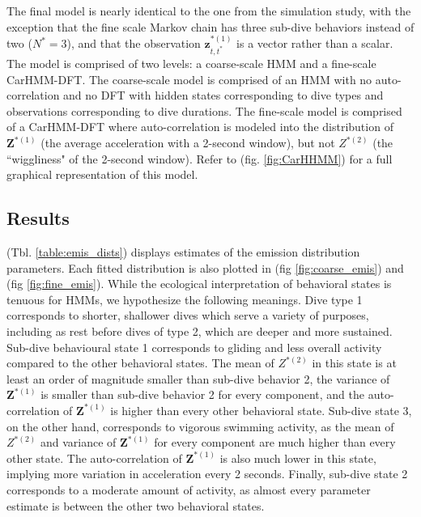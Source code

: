 The final model is nearly identical to the one from the simulation study, with the exception that the fine scale Markov chain has three sub-dive behaviors instead of two ($N^* = 3$), and that the observation $\mathbf{z}^{*(1)}_{t,t^*}$ is a vector rather than a scalar. The model is comprised of two levels: a coarse-scale HMM and a fine-scale CarHMM-DFT. The coarse-scale model is comprised of an HMM with no auto-correlation and no DFT with hidden states corresponding to dive types and observations corresponding to dive durations. The fine-scale model is comprised of a CarHMM-DFT where auto-correlation is modeled into the distribution of $\mathbf{Z}^{*(1)}$ (the average acceleration with a 2-second window), but not $Z^{*(2)}$ (the ``wiggliness" of the 2-second window). Refer to (fig. \ref{fig:CarHHMM}) for a full graphical representation of this model.

\subsection{Results}

(Tbl. \ref{table:emis_dists}) displays estimates of the emission distribution parameters. Each fitted distribution is also plotted in (fig \ref{fig:coarse_emis}) and (fig \ref{fig:fine_emis}). While the ecological interpretation of behavioral states is tenuous for HMMs, we hypothesize the following meanings. Dive type 1 corresponds to shorter, shallower dives which serve a variety of purposes, including as rest before dives of type 2, which are deeper and more sustained. Sub-dive behavioural state 1 corresponds to gliding and less overall activity compared to the other behavioral states. The mean of $Z^{*(2)}$ in this state is at least an order of magnitude smaller than sub-dive behavior 2, the variance of $\mathbf{Z}^{*(1)}$ is smaller than sub-dive behavior 2 for every component, and the auto-correlation of $\mathbf{Z}^{*(1)}$ is higher than every other behavioral state. Sub-dive state 3, on the other hand, corresponds to vigorous swimming activity, as the mean of $Z^{*(2)}$ and variance of $\mathbf{Z}^{*(1)}$ for every component are much higher than every other state. The auto-correlation of $\mathbf{Z}^{*(1)}$ is also much lower in this state, implying more variation in acceleration every 2 seconds. Finally, sub-dive state 2 corresponds to a moderate amount of activity, as almost every parameter estimate is between the other two behavioral states.

